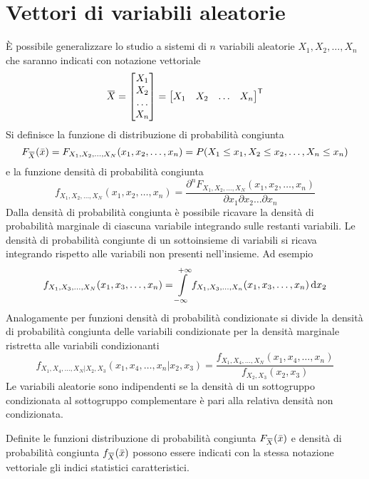 \section{Vettori di variabili aleatorie}
\`{E} possibile generalizzare lo studio a sistemi di $n$ variabili aleatorie $X_1, X_2,\dots,X_n$ che saranno indicati con notazione vettoriale
\begin{equation}\vect{X}=\begin{bmatrix}X_1\\X_2\\\dots\\X_n\end{bmatrix}=\trasp{\begin{bmatrix}X_1&X_2&\dots&X_n\end{bmatrix}} \end{equation}
Si definisce la funzione di distribuzione di probabilità congiunta
\begin{equation}F_\vect{X}(\bar{x})=F_{X_1,X_2,\dots,X_N}(x_1,x_2,\dots,x_n)=P(X_1\leq x_1,X_2\leq x_2,\dots,X_n\leq x_n)\end{equation}
e la funzione densità di probabilità congiunta
\begin{equation}f_{X_1,X_2,\dots,X_N}(x_1,x_2,\dots,x_n)=\frac{\partial^n F_{X_1,X_2,\dots,X_N}(x_1,x_2,\dots,x_n)}{\partial x_1\partial x_2\dots\partial x_n}\end{equation}
Dalla densità di probabilità congiunta è possibile ricavare la densità di probabilità marginale di ciascuna variabile integrando sulle restanti variabili. Le densità di probabilità congiunte di un sottoinsieme di variabili si ricava integrando rispetto alle variabili non presenti nell'insieme. Ad esempio
\begin{equation}f_{X_1,X_3,\dots,X_N}(x_1,x_3,\dots,x_n)=\int\limits_{-\infty}^{+\infty}{f_{X_1,X_3,\dots,X_n}(x_1,x_3,\dots,x_n)}{\,\mathop{}\!\mathrm{d}{x_2}}\end{equation}
Analogamente per funzioni densità di probabilità condizionate si divide la densità di probabilità congiunta delle variabili condizionate per la densità marginale ristretta alle variabili condizionanti
\begin{equation}
f_{X_1,X_4,\dots,X_N|X_2,X_3}(x_1,x_4,\dots,x_n|x_2,x_3)=\frac{f_{X_1,X_4,\dots,X_N}(x_1,x_4,\dots,x_n)}{f_{X_2,X_3}(x_2,x_3)}
\end{equation}
Le variabili aleatorie sono indipendenti se la densità di un sottogruppo condizionata al sottogruppo complementare è pari alla relativa densità non condizionata.

Definite le funzioni distribuzione di probabilità congiunta $F_\vect{X}(\bar{x})$ e densità di probabilità congiunta $f_\vect{X}(\bar{x})$ possono essere indicati con la stessa notazione vettoriale gli indici statistici caratteristici.

